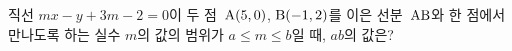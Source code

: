 직선 $mx-y+3m-2=0$이 두 점~$\mathrm{A}(5{,}\mkern3mu\mathopen{}0)$, $\mathrm{B}(-1{,}\mkern3mu\mathopen{}2)$를 이은 선분~$\mathrm{AB}$와 한 점에서 만나도록 하는 실수 $m$의 값의 범위가 $a\le m\le b$일 때, $ab$의 값은?
